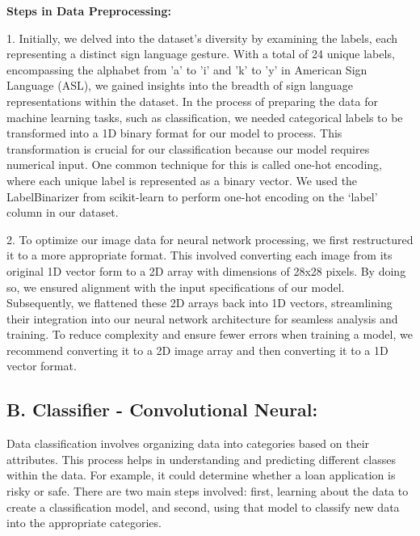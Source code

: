 \documentclass[conference]{IEEEtran}
\begin{document}
\vspace{\baselineskip}

\textbf{Steps in Data Preprocessing:}

\vspace{\baselineskip}

1. Initially, we delved into the dataset's diversity by examining the labels, each representing a distinct sign language gesture. With a total of 24 unique labels, encompassing the alphabet from 'a' to 'i' and 'k' to 'y' in American Sign Language (ASL), we gained insights into the breadth of sign language representations within the dataset. In the process of preparing the data for machine learning tasks, such as classification, we needed categorical labels to be transformed into a 1D binary format for our model to process. This transformation is crucial for our classification because our model requires numerical input. One common technique for this is called one-hot encoding, where each unique label is represented as a binary vector. We used the LabelBinarizer from scikit-learn to perform one-hot encoding on the ‘label’ column in our dataset.

\vspace{\baselineskip}

2. To optimize our image data for neural network processing, we first restructured it to a more appropriate format. This involved converting each image from its original 1D vector form to a 2D array with dimensions of 28x28 pixels. By doing so, we ensured alignment with the input specifications of our model. Subsequently, we flattened these 2D arrays back into 1D vectors, streamlining their integration into our neural network architecture for seamless analysis and training. To reduce complexity and ensure fewer errors when training a model, we recommend converting it to a 2D image array and then converting it to a 1D vector format.

\subsection{B. Classifier - Convolutional Neural:}

Data classification involves organizing data into categories based on their attributes. This process helps in understanding and predicting different classes within the data. For example, it could determine whether a loan application is risky or safe. There are two main steps involved: first, learning about the data to create a classification model, and second, using that model to classify new data into the appropriate categories.
\end{document}
